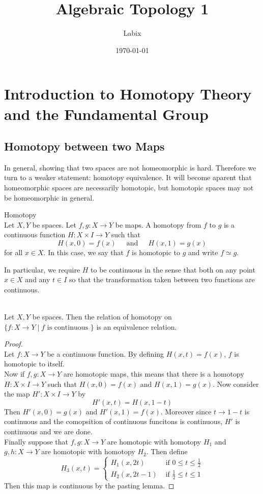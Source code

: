 \documentclass[a4paper]{article}
\title{Algebraic Topology 1}
\author{Labix}
\date{\today}
\begin{document}
\maketitle

\pagebreak
\tableofcontents
\pagebreak

\section{Introduction to Homotopy Theory and the Fundamental Group}
\subsection{Homotopy between two Maps}
In general, showing that two spaces are not homeomorphic is hard. Therefore we turn to a weaker statement: homotopy equivalence. It will become aparent that homeomorphic spaces are necessarily homotopic, but homotopic spaces may not be homeomorphic in general. 

\begin{defn}{Homotopy}{}\\
Let $X,Y$ be spaces. Let $f,g:X\to Y$ be maps. A homotopy from $f$ to $g$ is a continuous function $H:X\times I\to Y$ such that $$H(x,0)=f(x)\;\;\;\;\text{ and }\;\;\;\;H(x,1)=g(x)$$ for all $x\in X$. In this case, we say that $f$ is homotopic to $g$ and write $f\simeq g$. 
\end{defn}

In particular, we require $H$ to be continuous in the sense that both on any point $x\in X$ and any $t\in I$ so that the transformation taken between two functions are continuous. 

\begin{prp}{}{}\\
Let $X,Y$ be spaces. Then the relation of homotopy on $\{f:X\to Y\;|\;f\text{ is continuous }\}$ is an equivalence relation. 
\begin{proof}\\
Let $f:X\to Y$ be a continuous function. By defining $H(x,t)=f(x)$, $f$ is homotopic to itself. \\
Now if $f,g:X\to Y$ are homotopic maps, this means that there is a homotopy $H:X\times I\to Y$ such that $H(x,0)=f(x)$ and $H(x,1)=g(x)$. Now consider the map $H':X\times I\to Y$ by $$H'(x,t)=H(x,1-t)$$ Then $H'(x,0)=g(x)$ and $H'(x,1)=f(x)$. Moreover since $t\to 1-t$ is continuous and the comopsition of continuous funcitons is continuous, $H'$ is continuous and we are done. \\
Finally suppose that $f,g:X\to Y$ are homotopic with homotopy $H_1$ and $g,h:X\to Y$ are homotopic with homotopy $H_2$. Then define $$H_3(x,t)=\begin{cases}
H_1(x,2t) & \text{ if } 0\leq t\leq\frac{1}{2}\\
H_2(x,2t-1) & \text{ if } \frac{1}{2}\leq t\leq 1
\end{cases}$$
Then this map is continuous by the pasting lemma. 
\end{proof}
\end{prp}
\end{document}

